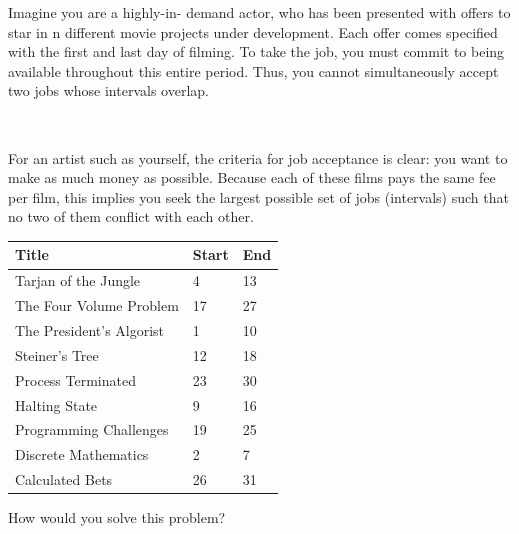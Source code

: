 \documentclass{cons-beamer}
\begin{document}
\begin{frame}
  \begin{example}
    \small
    Imagine you are a highly-in-
    demand actor, who has been presented with offers to star in n different movie
    projects under development. Each offer comes specified with the first and last day
    of filming. To take the job, you must commit to being available throughout this
    entire period. Thus, you cannot simultaneously accept two jobs whose intervals
    overlap.

    $ $
    
    For an artist such as yourself, the criteria for job acceptance is clear: you want
    to make as much money as possible. Because each of these films pays the same fee
    per film, this implies you seek the largest possible set of jobs (intervals) such that no two of them conflict with each other.

    \begin{table}[h!]
      \centering
      \tiny
      \begin{tabular}{| m{5cm} | m{2cm} | m{2cm} |}
        \hline
        \textbf{Title} & \textbf{Start} & \textbf{End} \\ \hline
        Tarjan of the Jungle & 4 & 13 \\ \hline
        The Four Volume Problem & 17 & 27 \\ \hline
        The President's Algorist & 1 & 10 \\ \hline
        Steiner's Tree & 12 & 18 \\ \hline
        Process Terminated & 23 & 30 \\ \hline
        Halting State & 9 & 16 \\ \hline
        Programming Challenges & 19 & 25 \\ \hline
        Discrete Mathematics & 2 & 7 \\ \hline
        Calculated Bets & 26 & 31 \\ \hline
      \end{tabular}
    \end{table}
  \end{example}
  How would you solve this problem?
\end{frame}
\end{document}
